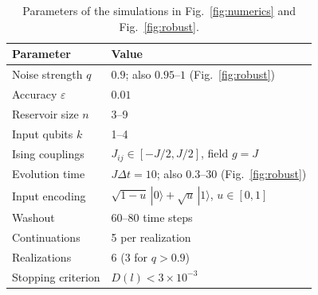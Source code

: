 \documentclass[aps,pra,reprint,superscriptaddress,floatfix]{revtex4-2}
\theoremstyle{plain}
\newcommand{\ket}[1]{|#1\rangle}
\begin{document}
\begin{table}[!tb]
\caption{Parameters of the simulations in Fig.~\ref{fig:numerics} and Fig.~\ref{fig:robust}.}
\label{tab:sim}
\begin{ruledtabular}
\begin{tabular}{p{3.2cm}p{4.4cm}}
{\raggedright Parameter\par} & {\raggedright Value\par} \\ \hline
{\raggedright Noise strength $q$\par} & {\raggedright $0.9$; also $0.95$--$1$ (Fig.~\ref{fig:robust})\par} \\
{\raggedright Accuracy $\varepsilon$\par} & {\raggedright $0.01$\par} \\
{\raggedright Reservoir size $n$\par} & {\raggedright 3--9\par} \\
{\raggedright Input qubits $k$\par} & {\raggedright 1--4\par} \\
{\raggedright Ising couplings\par} & {\raggedright $J_{ij}\in[-J/2,J/2]$, field $g=J$\par} \\
{\raggedright Evolution time\par} & {\raggedright $J\Delta t=10$; also 0.3--30 (Fig.~\ref{fig:robust})\par} \\
{\raggedright Input encoding\par} & {\raggedright $\sqrt{1-u}\,\ket0+\sqrt u\,\ket1$, $u\in[0,1]$\par} \\
{\raggedright Washout\par} & {\raggedright 60--80 time steps\par} \\
{\raggedright Continuations\par} & {\raggedright 5 per realization\par} \\
{\raggedright Realizations\par} & {\raggedright 6 (3 for $q>0.9$)\par} \\
{\raggedright Stopping criterion\par} & {\raggedright $D(l)<3\times10^{-3}$\par} \\
\end{tabular}
\end{ruledtabular}
\end{table}
\end{document}
